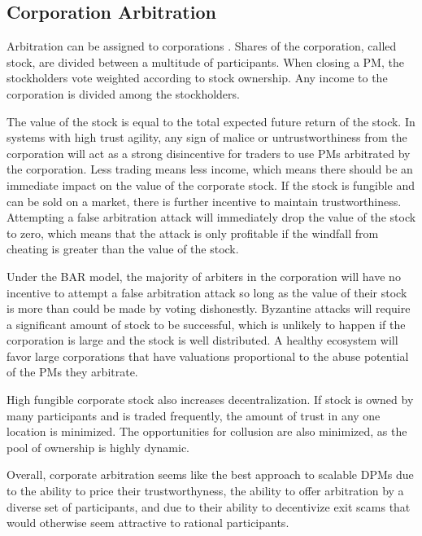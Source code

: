 \documentclass[onecolumn]{article}
\begin{document}
\subsection{Corporation Arbitration}
Arbitration can be assigned to corporations \cite{pmob}.
Shares of the corporation, called stock, are divided between a multitude of participants.
When closing a PM, the stockholders vote weighted according to stock ownership.
Any income to the corporation is divided among the stockholders.

The value of the stock is equal to the total expected future return of the stock.
In systems with high trust agility, any sign of malice or untrustworthiness from the corporation will act as a strong disincentive for traders to use PMs arbitrated by the corporation.
Less trading means less income, which means there should be an immediate impact on the value of the corporate stock.
If the stock is fungible and can be sold on a market, there is further incentive to maintain trustworthiness.
Attempting a false arbitration attack will immediately drop the value of the stock to zero, which means that the attack is only profitable if the windfall from cheating is greater than the value of the stock.

Under the BAR model, the majority of arbiters in the corporation will have no incentive to attempt a false arbitration attack so long as the value of their stock is more than could be made by voting dishonestly.
Byzantine attacks will require a significant amount of stock to be successful, which is unlikely to happen if the corporation is large and the stock is well distributed.
A healthy ecosystem will favor large corporations that have valuations proportional to the abuse potential of the PMs they arbitrate.

High fungible corporate stock also increases decentralization.
If stock is owned by many participants and is traded frequently, the amount of trust in any one location is minimized.
The opportunities for collusion are also minimized, as the pool of ownership is highly dynamic.

Overall, corporate arbitration seems like the best approach to scalable DPMs due to the ability to price their trustworthyness, the ability to offer arbitration by a diverse set of participants, and due to their ability to decentivize exit scams that would otherwise seem attractive to rational participants.
\end{document}
